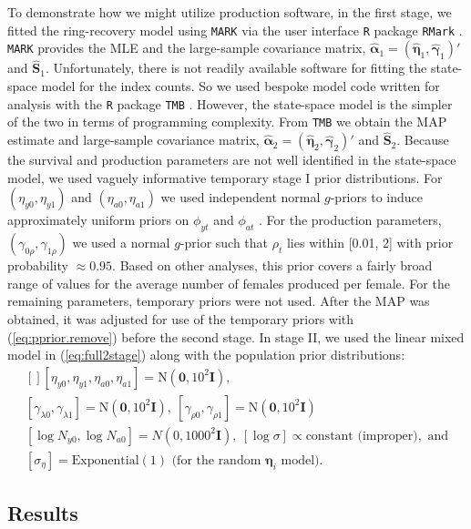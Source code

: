 \documentclass[12pt]{article}
\newcommand{\bn}{\boldsymbol{\eta}}
\newcommand{\bg}{\boldsymbol{\gamma}}
\newcommand{\ba}{\boldsymbol{\alpha}}
\newcommand{\bS}{\mathbf{S}}
\newcommand{\tN}{\text{N}}
\newcommand{\bI}{\mathbf{I}}
\begin{document}
To demonstrate how we might utilize production software, in the first stage, we fitted the ring-recovery model using {\tt MARK} \citep{white1999program} via the user interface {\tt R} package {\tt RMark} \citep{laake2013:RMark}. {\tt MARK} provides the MLE and the large-sample covariance matrix, $\hat{\ba}_1 = (\hat{\bn}_1, \hat{\bg}_1)'$ and $\hat{\bS}_1$. Unfortunately, there is not readily available software for fitting the state-space model for the index counts. So we used bespoke model code written for analysis with the {\tt R} package {\tt TMB} \citep{kristensen2016tmb}. However, the state-space model is the simpler of the two in terms of programming complexity. From {\tt TMB} we obtain the MAP estimate and large-sample covariance matrix, $\hat{\ba}_2 = (\hat{\bn}_2, \hat{\bg}_2)'$ and $\hat{\bS}_2$. Because the survival and production parameters are not well identified in the state-space model, we used vaguely informative temporary stage I prior distributions. For $(\eta_{y0},\eta_{y1})$ and $(\eta_{a0},\eta_{a1})$ we used independent normal $g$-priors to induce approximately uniform priors on $\phi_{yt}$ and $\phi_{at}$ \citep{hanson2014informative}. For the production parameters, $(\gamma_{0\rho},\gamma_{1\rho})$ we used a normal $g$-prior such that $\rho_t$ lies within [0.01, 2] with prior probability $\approx 0.95$. Based on other analyses, this prior covers a fairly broad range of values for the average number of females produced per female. For the remaining parameters, temporary priors were not used. After the MAP was obtained, it was adjusted for use of the temporary priors with (\ref{eq:pprior.remove}) before the second stage. In stage II, we used the linear mixed model in (\ref{eq:full2stage}) along with the population prior distributions:
\[
\begin{gathered}[]
[\eta_{y0}, \eta_{y1}, \eta_{a0}, \eta_{a1}] = \tN(\mathbf{0}, 10^2\bI),\\
[\gamma_{\lambda 0}, \gamma_{\lambda 1}] = \tN(\mathbf{0}, 10^2\bI),\ [\gamma_{\rho 0}, \gamma_{\rho 1}] = \tN(\mathbf{0}, 10^2\bI) \\
[\log N_{y0}, \log N_{a0}] = N(0, 1000^2\bI),\ [\log \sigma] \propto \text{constant (improper)}, \text{ and}\\
[\sigma_\eta] = \text{Exponential}(1) \text{ (for the random $\bn_i$ model)}.
\end{gathered}
\] 

\subsection{Results} 
\end{document}
